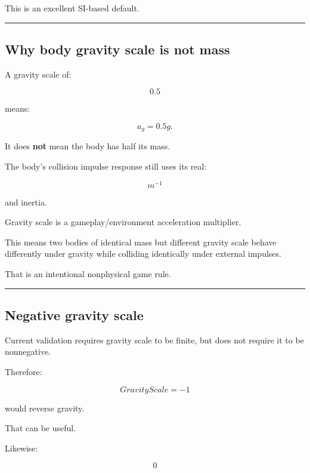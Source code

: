 This is an excellent SI-based default.

\begin{center}\rule{0.5\linewidth}{0.5pt}\end{center}

\subsection{Why body gravity scale is not mass}\label{06-engine-ii-ch038-why-body-gravity-scale-is-not-mass}

\hypertarget{06-engine-ii-ch038-why-body-gravity-scale-is-not-mass}{}

A gravity scale of:

\[
0.5
\]

means:

\[
a_g=
0.5g.
\]

It does \textbf{not} mean the body has half its mass.

The body's collision impulse response still uses its real:

\[
m^{-1}
\]

and inertia.

Gravity scale is a gameplay/environment acceleration multiplier.

This means two bodies of identical mass but different gravity scale behave differently under gravity while colliding identically under external impulses.

That is an intentional nonphysical game rule.

\begin{center}\rule{0.5\linewidth}{0.5pt}\end{center}

\subsection{Negative gravity scale}\label{06-engine-ii-ch038-negative-gravity-scale}

\hypertarget{06-engine-ii-ch038-negative-gravity-scale}{}

Current validation requires gravity scale to be finite, but does not require it to be nonnegative.

Therefore:

\[
GravityScale=-1
\]

would reverse gravity.

That can be useful.

Likewise:

\[
0
\]

